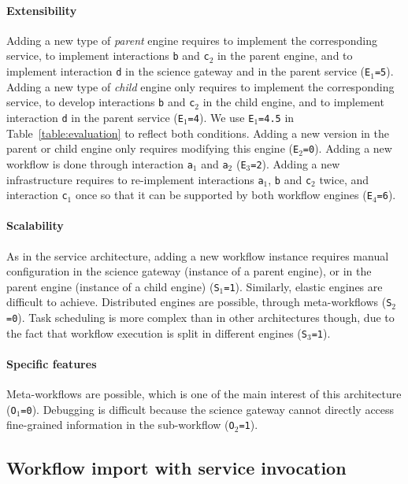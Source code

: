 \documentclass[preprint,3p,twocolumn]{elsarticle}
\begin{document}
\paragraph{Extensibility} Adding a new type of \emph{parent} engine
requires to implement the corresponding service, to implement
interactions \texttt{b} and \texttt{c$_2$} in the parent engine, and
to implement interaction \texttt{d} in the science gateway and in the
parent service (\texttt{E$_1$=5}). Adding a new type of \emph{child}
engine only requires to implement the corresponding service, to
develop interactions \texttt{b} and \texttt{c$_2$} in the child
engine, and to implement interaction \texttt{d} in the parent service
(\texttt{E$_1$=4}). We use \texttt{E$_1$=4.5} in
Table~\ref{table:evaluation} to reflect both conditions. Adding a new
version in the parent or child engine only requires modifying this
engine (\texttt{E$_2$=0}). Adding a new workflow is done through
interaction \texttt{a$_1$} and \texttt{a$_2$}
(\texttt{E$_3$=2}). Adding a new infrastructure requires to
re-implement interactions \texttt{a$_1$}, \texttt{b} and
\texttt{c$_2$} twice, and interaction \texttt{c$_1$} once so that it
can be supported by both workflow engines (\texttt{E$_4$=6}).

\paragraph{Scalability} As in the service architecture, adding a new
workflow instance requires manual configuration in the science gateway
(instance of a parent engine), or in the parent engine (instance of a
child engine) (\texttt{S$_1$=1}). Similarly, elastic engines are
difficult to achieve. Distributed engines are
possible, through meta-workflows (\texttt{S$_2$=0}). Task scheduling
is more complex than in other architectures though, due to the fact
that workflow execution is split in different engines (\texttt{S$_3$=1}).

\paragraph{Specific features}
Meta-workflows are possible, which is one of the main interest of this
architecture (\texttt{O$_1$=0}).  Debugging is difficult because the
science gateway cannot directly access fine-grained information in the
sub-workflow (\texttt{O$_2$=1}).

\subsection{Workflow import with service invocation}
\end{document}
